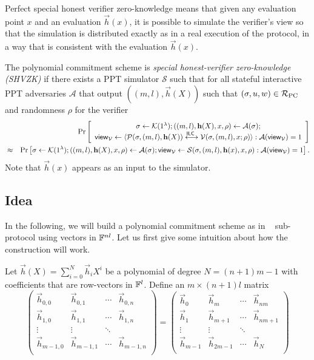 Perfect special honest verifier zero-knowledge means that given any evaluation point $x$ and an evaluation $\vec{h}(x)$, it is possible to simulate the verifier's view so that the simulation is distributed exactly as in a real execution of the protocol, in a way that is consistent with the evaluation $\vec{h}(x)$.
\begin{definition}
The polynomial commitment scheme is \emph{special honest-verifier zero-knowledge (SHVZK)} if there exists a PPT simulator $\mathcal{S}$ such that for all stateful interactive PPT adversaries $\mathcal{A}$ that output $((m,l),\vec{h}(X))$ such that $(\mathsf{\sigma},u,w)\in \mathcal{R}_\mathrm{PC}$ and randomness $\rho$ for the verifier
\begin{eqnarray*}
&&\Pr \left[ \begin{array}{c}\mathsf{\sigma}\gets \mathcal{K}(1^{\lambda});((m,l), \mathbf{h}(X),x, \rho) \leftarrow\mathcal{A}(\mathsf{\sigma}); \\
\mathsf{view}_{\mathcal{V}}\leftarrow \langle \mathcal{P}(\mathsf{\sigma},(m,l),\mathbf{h}(X))\overset{\mathsf{ILC}~}{\longleftrightarrow} \mathcal{V}(\mathsf{\sigma},(m,l),x;\rho)\rangle: \mathcal{A}(\mathsf{view}_{\mathcal{V}})=1\end{array} \right]\\
&\approx
&\Pr \left[ \mathsf{\sigma}\gets \mathcal{K}(1^{\lambda});((m,l), \mathbf{h}(X),x, \rho) \leftarrow\mathcal{A}(\mathsf{\sigma}); \mathsf{view}_{\mathcal{V}}\leftarrow \mathcal{S}(\mathsf{\sigma},(m,l),\mathbf{h}(x),x,\rho): \mathcal{A}(\mathsf{view}_{\mathcal{V}})=1\right].
\end{eqnarray*}
Note that $\vec{h}(x)$ appears as an input to the simulator.
\end{definition}

\subsection{Idea}

In the following, we will build a polynomial commitment scheme as in \ILC~ sub-protocol using vectors in $\mathbb{F}^{nl}$. Let us first give some intuition about how the construction will work. 

Let $\vec{h}(X)=\sum_{i=0}^N\vec{h}_iX^i$ be a polynomial of degree $N=(n+1)m-1$ with coefficients that are row-vectors in $\mathbb{F}^l$. Define an $m\times (n+1)l$ matrix $$
\left(\begin{array}{llll}
\vec{h}_{0,0} & \vec{h}_{0,1} &\cdots & \vec{h}_{0,n} \\
\vec{h}_{1,0} & \vec{h}_{1,1} & \cdots & \vec{h}_{1,n} \\
\vdots & \vdots &  \ddots & \\
\vec{h}_{m-1,0} & \vec{h}_{m-1,1} & \cdots &\vec{h}_{m-1,n}\\
\end{array} \right) = \left(\begin{array}{llll}
\vec{h}_0 & \vec{h}_{m} & \cdots & \vec{h}_{nm} \\
\vec{h}_1 & \vec{h}_{m+1} & \cdots & \vec{h}_{nm+1}\\
\vdots & \vdots & \ddots  & \\
\vec{h}_{m-1} & \vec{h}_{2m-1}  & \cdots  & \vec{h}_{N} \\
\end{array} \right)$$


